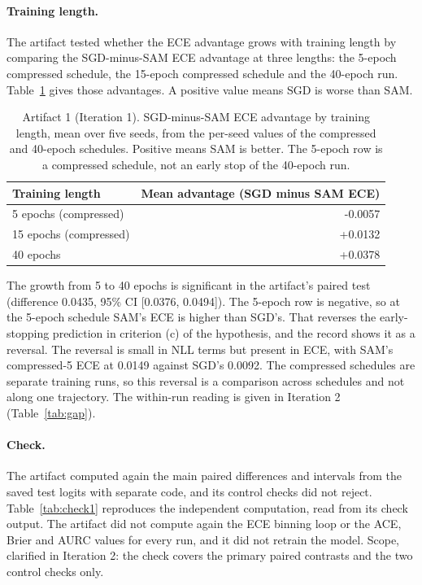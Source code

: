 \documentclass[11pt,letterpaper]{article}
\begin{document}
\paragraph{Training length.} The artifact tested whether the ECE advantage grows with training length by comparing the SGD-minus-SAM ECE advantage at three lengths: the 5-epoch compressed schedule, the 15-epoch compressed schedule and the 40-epoch run. Table~\ref{tab:trainlen} gives those advantages. A positive value means SGD is worse than SAM.

\begin{table}[!htbp]
\centering
\footnotesize
\caption{Artifact 1 (Iteration 1). SGD-minus-SAM ECE advantage by training length, mean over five seeds, from the per-seed values of the compressed and 40-epoch schedules. Positive means SAM is better. The 5-epoch row is a compressed schedule, not an early stop of the 40-epoch run.}
\label{tab:trainlen}
\begin{tabular}{lr}
\toprule
Training length & Mean advantage (SGD minus SAM ECE) \\
\midrule
5 epochs (compressed) & -0.0057 \\
15 epochs (compressed) & +0.0132 \\
40 epochs & +0.0378 \\
\bottomrule
\end{tabular}
\end{table}

The growth from 5 to 40 epochs is significant in the artifact's paired test (difference 0.0435, 95\% CI [0.0376, 0.0494]). The 5-epoch row is negative, so at the 5-epoch schedule SAM's ECE is higher than SGD's. That reverses the early-stopping prediction in criterion (c) of the hypothesis, and the record shows it as a reversal. The reversal is small in NLL terms but present in ECE, with SAM's compressed-5 ECE at 0.0149 against SGD's 0.0092. The compressed schedules are separate training runs, so this reversal is a comparison across schedules and not along one trajectory. The within-run reading is given in Iteration 2 (Table~\ref{tab:gap}).

\paragraph{Check.} The artifact computed again the main paired differences and intervals from the saved test logits with separate code, and its control checks did not reject. Table~\ref{tab:check1} reproduces the independent computation, read from its check output. The artifact did not compute again the ECE binning loop or the ACE, Brier and AURC values for every run, and it did not retrain the model. Scope, clarified in Iteration 2: the check covers the primary paired contrasts and the two control checks only.
\end{document}
